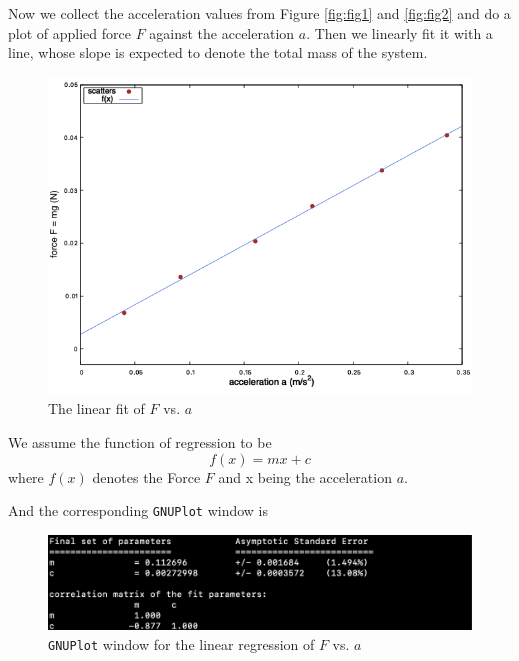 \documentclass[11pt, a4paper, abstract=true]{scrartcl}
\begin{document}
Now we collect the acceleration values from Figure \ref{fig:fig1} and \ref{fig:fig2} and do a plot of applied force \(F\) against the acceleration \(a\). Then we linearly fit it with a line, whose slope is expected to denote the total mass of the system.
\begin{figure}[H]
    \centering
    \includegraphics[scale=0.65]{assets/fixedmass_fit.png}
    \caption{The linear fit of \(F\) vs. \(a\)}
\end{figure}
\begin{algorithm}
    We assume the function of regression to be \[f(x) = mx + c\] where \(f(x)\) denotes the Force \(F\) and x being the acceleration \(a\).
\end{algorithm}
And the corresponding \texttt{GNUPlot} window is
\begin{figure}[H]
    \centering
    \includegraphics[scale=0.55]{assets/gnuplot_shots/fit.png}
    \caption{\texttt{GNUPlot} window for the linear regression of \(F\) vs. \(a\)}
\end{figure}

\newpage
\end{document}

